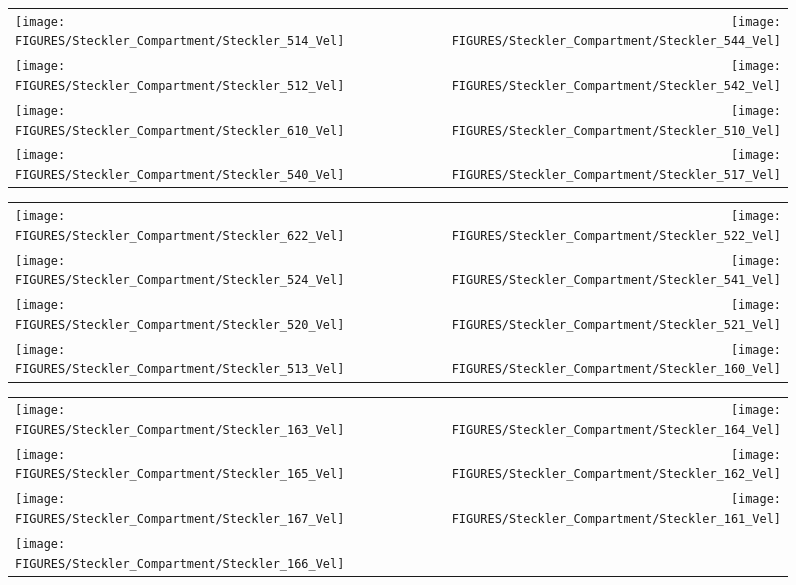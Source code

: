 \begin{figure}[p]
\begin{tabular*}{\textwidth}{l@{\extracolsep{\fill}}r}
\texttt{[image: FIGURES/Steckler\_Compartment/Steckler\_514\_Vel]} &
\texttt{[image: FIGURES/Steckler\_Compartment/Steckler\_544\_Vel]} \\
\texttt{[image: FIGURES/Steckler\_Compartment/Steckler\_512\_Vel]} &
\texttt{[image: FIGURES/Steckler\_Compartment/Steckler\_542\_Vel]} \\
\texttt{[image: FIGURES/Steckler\_Compartment/Steckler\_610\_Vel]} &
\texttt{[image: FIGURES/Steckler\_Compartment/Steckler\_510\_Vel]} \\
\texttt{[image: FIGURES/Steckler\_Compartment/Steckler\_540\_Vel]} &
\texttt{[image: FIGURES/Steckler\_Compartment/Steckler\_517\_Vel]}
\end{tabular*}
\label{Steckler_Vel_5}
\end{figure}

\begin{figure}[p]
\begin{tabular*}{\textwidth}{l@{\extracolsep{\fill}}r}
\texttt{[image: FIGURES/Steckler\_Compartment/Steckler\_622\_Vel]} &
\texttt{[image: FIGURES/Steckler\_Compartment/Steckler\_522\_Vel]} \\
\texttt{[image: FIGURES/Steckler\_Compartment/Steckler\_524\_Vel]} &
\texttt{[image: FIGURES/Steckler\_Compartment/Steckler\_541\_Vel]} \\
\texttt{[image: FIGURES/Steckler\_Compartment/Steckler\_520\_Vel]} &
\texttt{[image: FIGURES/Steckler\_Compartment/Steckler\_521\_Vel]} \\
\texttt{[image: FIGURES/Steckler\_Compartment/Steckler\_513\_Vel]} &
\texttt{[image: FIGURES/Steckler\_Compartment/Steckler\_160\_Vel]}
\end{tabular*}
\label{Steckler_Vel_6}
\end{figure}

\begin{figure}[p]
\begin{tabular*}{\textwidth}{l@{\extracolsep{\fill}}r}
\texttt{[image: FIGURES/Steckler\_Compartment/Steckler\_163\_Vel]} &
\texttt{[image: FIGURES/Steckler\_Compartment/Steckler\_164\_Vel]} \\
\texttt{[image: FIGURES/Steckler\_Compartment/Steckler\_165\_Vel]} &
\texttt{[image: FIGURES/Steckler\_Compartment/Steckler\_162\_Vel]} \\
\texttt{[image: FIGURES/Steckler\_Compartment/Steckler\_167\_Vel]} &
\texttt{[image: FIGURES/Steckler\_Compartment/Steckler\_161\_Vel]} \\
\texttt{[image: FIGURES/Steckler\_Compartment/Steckler\_166\_Vel]} &

\end{tabular*}
\label{Steckler_Vel_7}
\end{figure}

